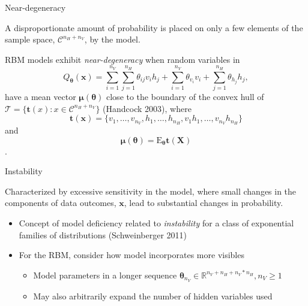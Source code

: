 \documentclass[ignorenonframetext,]{beamer}
\providecommand{\tightlist}{%
  \setlength{\itemsep}{0pt}\setlength{\parskip}{0pt}}
\theoremstyle{definition}
\newcommand{\nv}{{n_{\scriptscriptstyle V}}}
\newcommand{\nh}{{n_{\scriptscriptstyle H}}}
\begin{document}
\begin{frame}{Near-degeneracy}
\protect\hypertarget{near-degeneracy}{}

\begin{definition}
A disproportionate amount of probability is placed on only a few elements of the sample space, $\mathcal{C}^{\nh + \nv}$, by the model.
\end{definition}

RBM models exhibit \emph{near-degeneracy} when random variables in
\[Q_{\boldsymbol \theta}(\boldsymbol x) = \sum\limits_{i = 1}^{\nv} \sum\limits_{j=1}^{\nh} \theta_{ij} v_i h_j + \sum\limits_{i = 1}^\nv\theta_{v_i} v_i + \sum\limits_{j = 1}^\nh\theta_{h_j} h_j,
\] have a mean vector \(\boldsymbol \mu(\boldsymbol \theta)\) close to
the boundary of the convex hull of
\(\mathcal{T} = \{\boldsymbol t(x): x \in \mathcal{C}^{\nh + \nv}\}\)
(Handcock 2003), where
\[\boldsymbol t(\boldsymbol x) = \{v_1, \dots, v_{\nv}, h_1, \dots, h_{\nh}, v_1 h_1, \dots, v_{\nv} h_{\nh} \}\]
and
\[\boldsymbol \mu(\boldsymbol \theta) = \text{E}_{\boldsymbol \theta} \boldsymbol t(\boldsymbol X)\].

\end{frame}

\begin{frame}{Instability}
\protect\hypertarget{instability}{}

\begin{definition}[Instability]
Characterized by excessive sensitivity in the model, where small changes in the components of data outcomes, $\boldsymbol x$, lead to substantial changes in probability.
\end{definition}

\begin{itemize}
\tightlist
\item
  Concept of model deficiency related to \emph{instability} for a class
  of exponential families of distributions (Schweinberger 2011)
\item
  For the RBM, consider how model incorporates more visibles

  \begin{itemize}
  \tightlist
  \item
    Model parameters in a longer sequence
    \(\boldsymbol \theta_{\nv} \in \mathbb{R}^{\nv + \nh + \nv*\nh}, \nv \ge 1\)
  \item
    May also arbitrarily expand the number of hidden variables used
  \end{itemize}
\end{itemize}

\end{frame}
\end{document}
